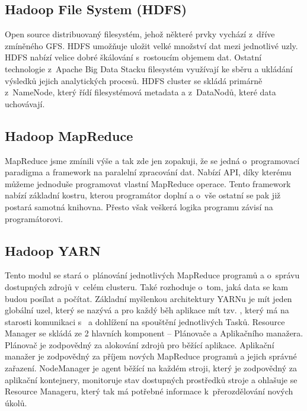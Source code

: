 \subsection{Hadoop File System (HDFS)}
Open source distribuovaný filesystém, jehož některé prvky vychází z~dříve zmíněného GFS. HDFS umožňuje uložit velké množství dat mezi jednotlivé uzly. HDFS nabízí velice dobré škálování s~rostoucím objemem dat. Ostatní technologie z~Apache Big Data Stacku filesystém využívají ke sběru a ukládání výsledků jejich analytických procesů. HDFS cluster se skládá primárně z~NameNode, který řídí filesystémová metadata a z~DataNodů, které data uchovávají. 

\subsection{Hadoop MapReduce}
MapReduce jsme zmínili výše a tak zde jen zopakuji, že se jedná o~programovací paradigma a framework na paralelní zpracování dat. Nabízí API, díky kterému můžeme jednoduše programovat vlastní MapReduce operace. Tento framework nabízí základní kostru, kterou programátor doplní a o~vše ostatní se pak již postará samotná knihovna. Přesto však veškerá logika programu závisí na programátorovi. 

\subsection{Hadoop YARN}
Tento modul se stará o~plánování jednotlivých MapReduce programů a o~správu dostupných zdrojů v~celém clusteru. Také rozhoduje o~tom, jaká data se kam budou posílat a počítat. Základní myšlenkou architektury YARNu je mít jeden globální uzel, který se nazývá  a pro každý běh aplikace mít tzv. , který má na starosti komunikaci s~ a dohlížení na spouštění jednotlivých Tasků. Resource Manager se skládá ze 2 hlavních komponent – Plánovače a Aplikačního manažera. Plánovač je zodpovědný za alokování zdrojů pro běžící aplikace. Aplikační manažer je zodpovědný za příjem nových MapReduce programů a jejich správné zařazení. NodeManager je agent běžící na každém stroji, který je zodpovědný za aplikační kontejnery, monitoruje stav dostupných prostředků stroje a ohlašuje se Resource Manageru, který tak má potřebné informace k~přerozdělování nových úkolů.

